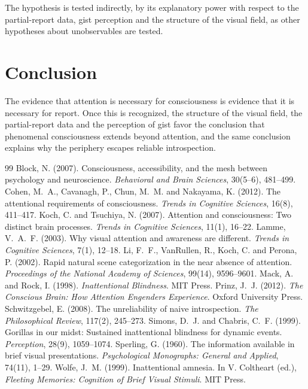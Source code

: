 \documentclass{situationist-preprint}
\begin{document}
\begin{reply}
The hypothesis is tested indirectly, by its explanatory power with respect to the partial-report data, gist perception and the structure of the visual field, as other hypotheses about unobservables are tested.
\end{reply}

\section{Conclusion}

The evidence that attention is necessary for consciousness is evidence that it is necessary for report. Once this is recognized, the structure of the visual field, the partial-report data and the perception of gist favor the conclusion that phenomenal consciousness extends beyond attention, and the same conclusion explains why the periphery escapes reliable introspection.

\begin{thebibliography}{99}\small
{} Block, N. (2007). Consciousness, accessibility, and the mesh between psychology and neuroscience. \emph{Behavioral and Brain Sciences}, 30(5--6), 481--499.
 Cohen, M.~A., Cavanagh, P., Chun, M.~M. and Nakayama, K. (2012). The attentional requirements of consciousness. \emph{Trends in Cognitive Sciences}, 16(8), 411--417.
 Koch, C. and Tsuchiya, N. (2007). Attention and consciousness: Two distinct brain processes. \emph{Trends in Cognitive Sciences}, 11(1), 16--22.
 Lamme, V.~A.~F. (2003). Why visual attention and awareness are different. \emph{Trends in Cognitive Sciences}, 7(1), 12--18.
 Li, F.~F., VanRullen, R., Koch, C. and Perona, P. (2002). Rapid natural scene categorization in the near absence of attention. \emph{Proceedings of the National Academy of Sciences}, 99(14), 9596--9601.
 Mack, A. and Rock, I. (1998). \emph{Inattentional Blindness}. MIT Press.
 Prinz, J.~J. (2012). \emph{The Conscious Brain: How Attention Engenders Experience}. Oxford University Press.
 Schwitzgebel, E. (2008). The unreliability of naive introspection. \emph{The Philosophical Review}, 117(2), 245--273.
 Simons, D.~J. and Chabris, C.~F. (1999). Gorillas in our midst: Sustained inattentional blindness for dynamic events. \emph{Perception}, 28(9), 1059--1074.
 Sperling, G. (1960). The information available in brief visual presentations. \emph{Psychological Monographs: General and Applied}, 74(11), 1--29.
 Wolfe, J.~M. (1999). Inattentional amnesia. In V. Coltheart (ed.), \emph{Fleeting Memories: Cognition of Brief Visual Stimuli}. MIT Press.
\end{thebibliography}
\end{document}
